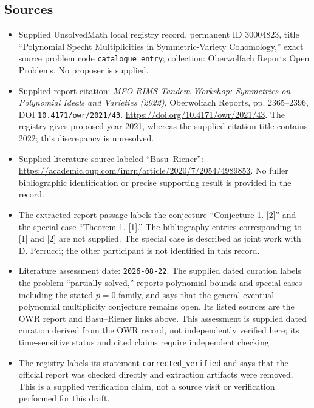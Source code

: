 \documentclass[11pt]{article}
\begin{document}
\subsection{Sources}
\begin{itemize}
\item Supplied UnsolvedMath local registry record, permanent ID \(30004823\), title ``Polynomial Specht Multiplicities in Symmetric-Variety Cohomology,'' exact source problem code \texttt{catalogue entry}; collection: Oberwolfach Reports Open Problems. No proposer is supplied.
\item Supplied report citation: \emph{MFO-RIMS Tandem Workshop: Symmetries on Polynomial Ideals and Varieties (2022)}, Oberwolfach Reports, pp. 2365--2396, DOI \texttt{10.4171/owr/2021/43}. \url{https://doi.org/10.4171/owr/2021/43}. The registry gives proposed year 2021, whereas the supplied citation title contains 2022; this discrepancy is unresolved.
\item Supplied literature source labeled ``Basu--Riener'': \url{https://academic.oup.com/imrn/article/2020/7/2054/4989853}. No fuller bibliographic identification or precise supporting result is provided in the record.
\item The extracted report passage labels the conjecture ``Conjecture 1. [2]'' and the special case ``Theorem 1. [1].'' The bibliography entries corresponding to [1] and [2] are not supplied. The special case is described as joint work with D. Perrucci; the other participant is not identified in this record.
\item Literature assessment date: \texttt{2026-08-22}. The supplied dated curation labels the problem ``partially solved,'' reports polynomial bounds and special cases including the stated \(p=0\) family, and says that the general eventual-polynomial multiplicity conjecture remains open. Its listed sources are the OWR report and Basu--Riener links above. This assessment is supplied dated curation derived from the OWR record, not independently verified here; its time-sensitive status and cited claims require independent checking.
\item The registry labels its statement \texttt{corrected\_verified} and says that the official report was checked directly and extraction artifacts were removed. This is a supplied verification claim, not a source visit or verification performed for this draft.
\end{itemize}
\end{document}
